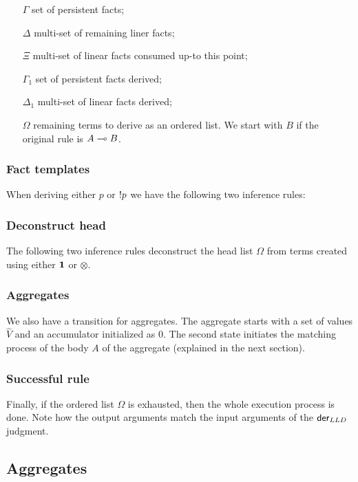 \begin{enumerate}
   \item[$\Gamma$] set of persistent facts;

   \item[$\Delta$] multi-set of remaining liner facts;

   \item[$\Xi$] multi-set of linear facts consumed up-to this point;

   \item[$\Gamma_1$] set of persistent facts derived;

   \item[$\Delta_1$] multi-set of linear facts derived;

   \item[$\Omega$] remaining terms to derive as an ordered list. We start with
   $B$ if the original rule is $A \multimap B$.

\end{enumerate}

\subsubsection{Fact templates}

When deriving either $p$ or ${!} p$ we have the following two inference rules:



\subsubsection{Deconstruct head}

The following two inference rules deconstruct the head list $\Omega$ from terms
created using either $\mathbf{1}$ or $\otimes$.



\subsubsection{Aggregates}

We also have a transition for aggregates. The aggregate starts with a set of
values $\widehat{V}$ and an accumulator initialized as $0$. The second state
initiates the matching process of the body $A$ of the aggregate (explained in
the next section).



\subsubsection{Successful rule}

Finally, if the ordered list $\Omega$ is exhausted, then the whole execution
process is done.  Note how the output arguments match the input arguments of the
$\mathsf{der}_{LLD} \;$judgment.



\subsection{Aggregates}



